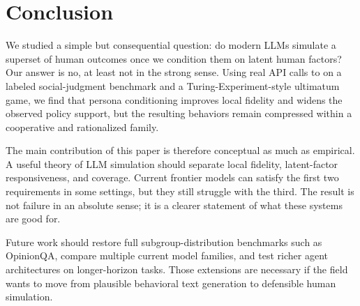 \section{Conclusion}
\label{sec:conclusion}

We studied a simple but consequential question: do modern LLMs simulate a superset of human outcomes once we condition them on latent human factors? Our answer is no, at least not in the strong sense. Using real API calls to \gptfourone on a labeled social-judgment benchmark and a Turing-Experiment-style ultimatum game, we find that persona conditioning improves local fidelity and widens the observed policy support, but the resulting behaviors remain compressed within a cooperative and rationalized family.

The main contribution of this paper is therefore conceptual as much as empirical. A useful theory of LLM simulation should separate local fidelity, latent-factor responsiveness, and coverage. Current frontier models can satisfy the first two requirements in some settings, but they still struggle with the third. The result is not failure in an absolute sense; it is a clearer statement of what these systems are good for.

Future work should restore full subgroup-distribution benchmarks such as OpinionQA, compare multiple current model families, and test richer agent architectures on longer-horizon tasks. Those extensions are necessary if the field wants to move from plausible behavioral text generation to defensible human simulation.
